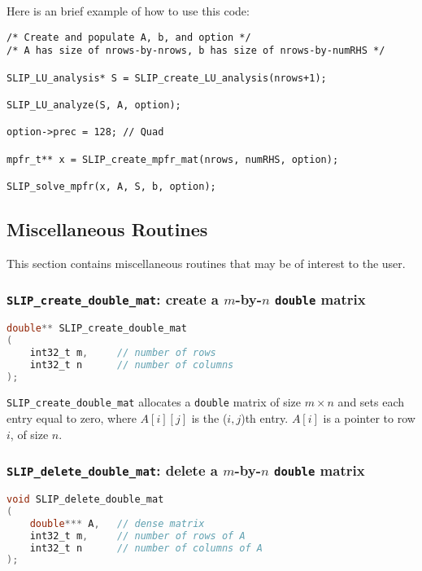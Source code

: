 \documentclass[11pt]{article}
\theoremstyle{definition}
\begin{document}
Here is an brief example of how to use this code:

\begin{verbatim}
/* Create and populate A, b, and option */
/* A has size of nrows-by-nrows, b has size of nrows-by-numRHS */

SLIP_LU_analysis* S = SLIP_create_LU_analysis(nrows+1);

SLIP_LU_analyze(S, A, option);

option->prec = 128; // Quad

mpfr_t** x = SLIP_create_mpfr_mat(nrows, numRHS, option);

SLIP_solve_mpfr(x, A, S, b, option);

\end{verbatim}










\subsection{Miscellaneous Routines}\label{s:miscellaneous_routine}

This section contains miscellaneous routines that may be of interest to the user.


\cprotect\subsubsection{\verb|SLIP_create_double_mat|: create a $m$-by-$n$ \verb|double| matrix} \label{ss:create_double_mat}

\begin{lstlisting}[language=C,frame=single]
double** SLIP_create_double_mat
(
    int32_t m,     // number of rows
    int32_t n      // number of columns
);
\end{lstlisting}


\verb|SLIP_create_double_mat| allocates a \verb|double| matrix of size $m \times n$ and sets each entry equal to zero, where $A[i][j]$ is the ($i,j$)th entry. $A[i]$ is a pointer to row $i$, of size $n$.

\cprotect\subsubsection{\verb|SLIP_delete_double_mat|: delete a $m$-by-$n$ \verb|double| matrix}


\begin{lstlisting}[language=C,frame=single]
void SLIP_delete_double_mat
(
    double*** A,   // dense matrix
    int32_t m,     // number of rows of A
    int32_t n      // number of columns of A
);
\end{lstlisting}
\end{document}

